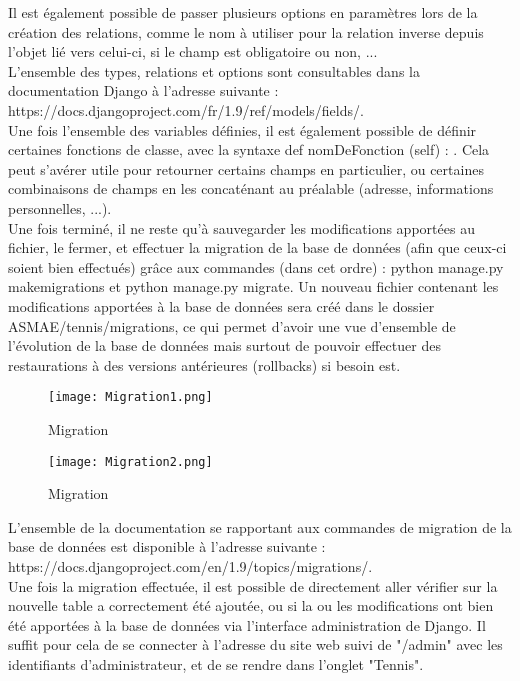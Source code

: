 Il est également possible de passer plusieurs options en paramètres lors de la création des relations, comme le nom à utiliser pour la relation inverse depuis l’objet lié vers celui-ci, si le champ est obligatoire ou non, ...\\

L'ensemble des types, relations et options sont consultables dans la documentation Django à l'adresse suivante : https://docs.djangoproject.com/fr/1.9/ref/models/fields/.\\

Une fois l'ensemble des variables définies, il est également possible de définir certaines fonctions de classe, avec la syntaxe def nomDeFonction (self) : . Cela peut s'avérer utile pour retourner certains champs en particulier, ou certaines combinaisons de champs en les concaténant au préalable (adresse, informations personnelles, ...).\\

Une fois terminé, il ne reste qu'à sauvegarder les modifications apportées au fichier, le fermer, et effectuer la migration de la base de données (afin que ceux-ci soient bien effectués) grâce aux commandes (dans cet ordre) : python manage.py makemigrations et python manage.py migrate. Un nouveau fichier contenant les modifications apportées à la base de données sera créé dans le dossier ASMAE/tennis/migrations, ce qui permet d'avoir une vue d'ensemble de l'évolution de la base de données mais surtout de pouvoir effectuer des restaurations à des versions antérieures (rollbacks) si besoin est.\\

\begin{figure}[H]
\centering
\texttt{[image: Migration1.png]}
\caption{Migration}
\end{figure}

\begin{figure}[H]
\centering
\texttt{[image: Migration2.png]}
\caption{Migration}
\end{figure}

L'ensemble de la documentation se rapportant aux commandes de migration de la base de données est disponible à l'adresse suivante : https://docs.djangoproject.com/en/1.9/topics/migrations/.\\

Une fois la migration effectuée, il est possible de directement aller vérifier sur la nouvelle table a correctement été ajoutée, ou si la ou les modifications ont bien été apportées à la base de données via l'interface administration de Django. Il suffit pour cela de se connecter à l'adresse du site web suivi de "/admin" avec les identifiants d'administrateur, et de se rendre dans l'onglet "Tennis".\\

